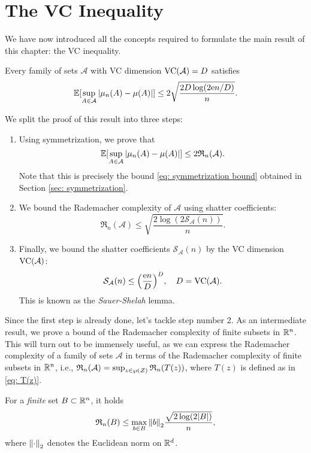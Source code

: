 \section{The VC Inequality}
\label{sec: VC inequality}

We have now introduced all the concepts required to formulate the main result of this chapter: the VC inequality.

\begin{theorem}[VC Inequality]
Every family of sets $\mathcal{A}$ with VC dimension $\operatorname{VC}(\mathcal{A}) = D$ satisfies
\[
    \operatorname{\mathbb{E}}[\sup_{A \in \mathcal{A}} \abs{\mu_n(A) - \mu(A)}] \leq 2 \sqrt{\frac{2D \log(2\mathrm{e} n / D)}{n}}.
\]
\end{theorem}

We split the proof of this result into three steps:

\begin{enumerate}
    \item Using symmetrization, we prove that
    \[
        \operatorname{\mathbb{E}}[\sup_{A \in \mathcal{A}} \abs{\mu_n(A) - \mu(A)}] \leq 2 \mathfrak{R}_n(\mathcal{A}).
    \]
    Note that this is precisely the bound \eqref{eq: symmetrization bound} obtained in Section \ref{sec: symmetrization}.

    \item We bound the Rademacher complexity of $\mathcal{A}$ using shatter coefficients:
    \[
        \mathfrak{R}_n(\mathcal{A}) \leq \sqrt{\frac{2 \log(2 \mathcal{S}_{\mathcal{A}}(n))}{n}}.
    \]

    \item Finally, we bound the shatter coefficients $\mathcal{S}_{\mathcal{A}}(n)$ by the VC dimension $\operatorname{VC}(\mathcal{A})$:
    \[
        \mathcal{S}_{\mathcal{A}}(n) \leq \left(\frac{\e n}{D}\right)^D, \quad D = \VC(\mathcal{A}).
    \]
    This is known as the \emph{Sauer-Shelah} lemma.
\end{enumerate}

Since the first step is already done, let's tackle step number 2. As an intermediate result, we prove a bound of the Rademacher complexity of finite subsets in $\mathbb{R}^n$. This will turn out to be immensely useful, as we can express the Rademacher complexity of a family of sets $\mathcal{A}$ in terms of the Rademacher complexity of finite subsets in $\mathbb{R}^n$, i.e., $\mathfrak{R}_n(\mathcal{A}) = \sup_{z \in \operatorname{\wp}(\mathcal{Z})} \mathfrak{R}_n(T(z))$, where $T(z)$ is defined as in \eqref{eq: T(z)}.

\begin{lemma}
\label{lem: bound on rademacher complexity of finite set}
For a \emph{finite} set $B \subset \mathbb{R}^n$, it holds
\[
    \mathfrak{R}_n(B) \leq \max_{b \in B} \norm{b}_2 \frac{\sqrt{2 \log(2 \abs{B})}}{n},
\]
where $\norm{\cdot}_2$ denotes the Euclidean norm on $\mathbb{R}^d$.
\end{lemma}

